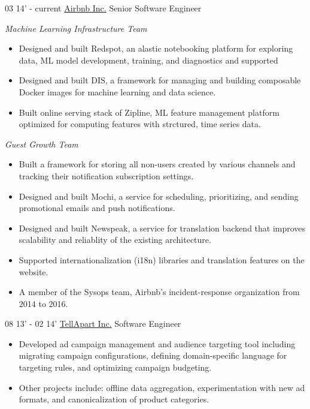 \documentclass[]{patyoon-cv}
\begin{document}
\begin{entrylist}
  \entry
  {03 14' - current}
  {\href{https://www.airbnb.com/}{Airbnb Inc.}}
  {Senior Software Engineer}
    {\begin{spacing}{0.5} \end{spacing}
      \emph{\small Machine Learning Infrastructure Team}\\
          \begin{itemize}
    \item Designed and built Redspot, an alastic notebooking platform for exploring data, ML model development, training, and diagnostics and supported
    \item Designed and built DIS, a framework for managing and building composable Docker images for machine learning and data science.
    \item Built online serving stack of Zipline, ML feature management platform optimized for computing features with strctured, time series data.
    \end{itemize}
  \begin{spacing}{1.5} \end{spacing}
      \emph{\small Guest Growth Team}\\
    \begin{itemize}
    \item Built a framework for storing all non-users created by various channels and tracking their notification subscription settings.
    \item Designed and built Mochi, a service for scheduling, prioritizing, and sending promotional emails and push notifications.
    \item Designed and built Newspeak, a service for translation backend that improves scalability and reliablity of the existing architecture.
    \item Supported internationalization (i18n) libraries and translation features on the website.
    \item A member of the Sysops team, Airbnb's incident-response organization from 2014 to 2016.
    \end{itemize}
  }
  \entry
  {08 13' - 02 14'}
  {\href{https://tellapart.com/}{TellApart Inc.}}
  {Software Engineer}
  {\begin{itemize}
    \item Developed ad campaign management and audience targeting tool including migrating campaign configurations, defining domain-specific language for targeting rules, and optimizing campaign budgeting.
    \item Other projects include: offline data aggregation, experimentation with new ad formats, and canonicalization of product categories.

\end{itemize}}
\end{entrylist}
\end{document}

